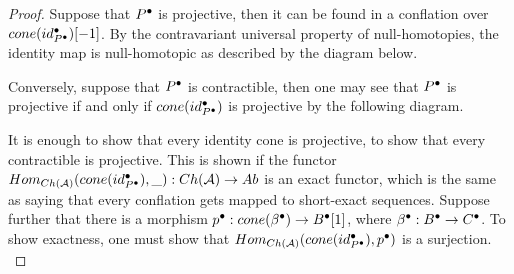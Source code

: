     \begin{proof}
        Suppose that $P^{\bullet}$ is projective, then it can be found in a conflation over $cone(id_{P^{\bullet}}^{\bullet})[-1]$. By the contravariant universal property of null-homotopies, the identity map is null-homotopic as described by the diagram below.
        \begin{center}
        \end{center}

        Conversely, suppose that $P^{\bullet}$ is contractible, then one may see that $P^{\bullet}$ is projective if and only if $cone(id_{P^{\bullet}}^{\bullet})$ is projective by the following diagram.

        \begin{center}
        \end{center}
        
        It is enough to show that every identity cone is projective, to show that every contractible is projective. This is shown if the functor $Hom_{Ch(\mathcal{A})}(cone(id_{P^{\bullet}}^{\bullet}),\_):Ch(\mathcal{A})\rightarrow Ab$ is an exact functor, which is the same as saying that every conflation gets mapped to short-exact sequences. Suppose further that there is a morphism $p^{\bullet}:cone(\beta^{\bullet})\rightarrow B^{\bullet}[1]$, where $\beta^{\bullet}:B^{\bullet}\rightarrow C^{\bullet}$. To show exactness, one must show that $Hom_{Ch(\mathcal{A})}(cone(id_{P^{\bullet}}^{\bullet}),p^{\bullet})$ is a surjection. \\


\end{proof}
